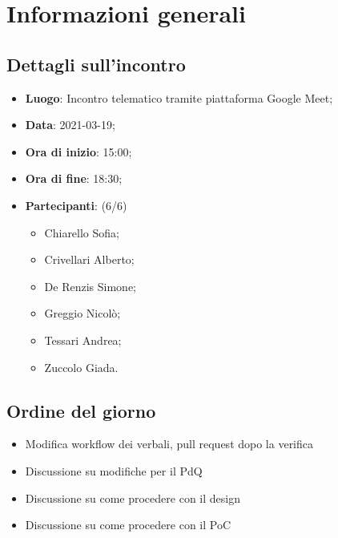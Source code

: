 \section{Informazioni generali}

\subsection{Dettagli sull'incontro}
\begin{itemize}
\item \textbf{Luogo}: Incontro telematico tramite piattaforma Google Meet;
\item \textbf{Data}: 2021-03-19;
\item \textbf{Ora di inizio}: 15:00;
\item \textbf{Ora di fine}: 18:30;
\item \textbf{Partecipanti}: (6/6) 
\begin{itemize}
	\item Chiarello Sofia;
	\item Crivellari Alberto;
	\item De Renzis Simone;
	\item Greggio Nicolò;
	\item Tessari Andrea;
	\item Zuccolo Giada.
\end{itemize}
\end{itemize}

\subsection{Ordine del giorno}
\begin{itemize}
	\item Modifica workflow dei verbali, pull request dopo la verifica
	\item Discussione su modifiche per il PdQ
	\item Discussione su come procedere con il design
	\item Discussione su come procedere con il PoC
	
\end{itemize}



